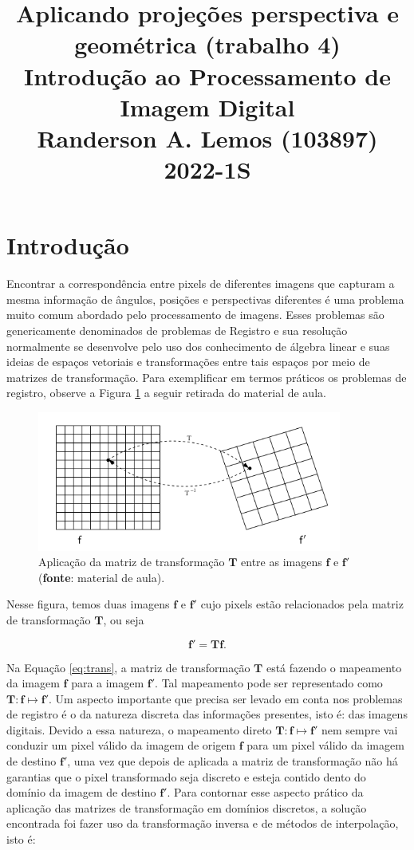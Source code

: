 \documentclass{article}
\title{
	Aplicando projeções perspectiva e geométrica (trabalho 4) \\
	\Large Introdução ao Processamento de Imagem Digital \\
	Randerson A. Lemos (103897)
	2022-1S
}
\date{\vspace{-5ex}}
\begin{document}
  \maketitle

%
\section{Introdução}
Encontrar a correspondência entre pixels de diferentes imagens que capturam a mesma informação de ângulos, posições e perspectivas diferentes é uma problema muito comum abordado pelo processamento de imagens. Esses problemas são genericamente denominados de problemas de Registro e sua resolução normalmente se desenvolve pelo uso dos conhecimento de álgebra linear e suas ideias de espaços vetoriais e transformações entre tais espaços por meio de matrizes de transformação. Para exemplificar em termos práticos os problemas de registro, observe a Figura \ref{fig:trans} a seguir retirada do material de aula.

\begin{figure}[!htp]%
	\centering
	\includegraphics[width=10cm]{transformacao.png}
	\caption{Aplicação da matriz de transformação $\mathbf{T}$ entre as imagens $\mathbf{f}$ e $\mathbf{f'}$ (\textbf{fonte}: material de aula).}%
	\label{fig:trans}%
\end{figure}

\noindent
Nesse figura, temos duas imagens $\mathbf{f}$ e $\mathbf{f'}$ cujo pixels estão relacionados pela matriz de transformação $\mathbf{T}$, ou seja

\begin{equation}
\mathbf{f'} = \mathbf{T}\mathbf{f}.
\label{eq:trans}
\end{equation}

\noindent
Na Equação \ref{eq:trans}, a matriz de transformação $\mathbf{T}$ está fazendo o mapeamento da imagem $\mathbf{f}$ para a imagem $\mathbf{f'}$. Tal mapeamento pode ser representado como $\mathbf{T}: \mathbf{f} \mapsto \mathbf{f'}$. Um aspecto importante que precisa ser levado em conta nos problemas de registro é o da natureza discreta das informações presentes, isto é: das imagens digitais. Devido a essa natureza, o mapeamento direto $\mathbf{T}: \mathbf{f} \mapsto \mathbf{f'}$ nem sempre vai conduzir um pixel válido da imagem de origem $\mathbf{f}$ para um pixel válido da imagem de destino $\mathbf{f'}$, uma vez que depois de aplicada a matriz de transformação não há garantias que o pixel transformado seja discreto e esteja contido dento do domínio da imagem de destino $\mathbf{f'}$. Para contornar esse aspecto prático da aplicação das matrizes de transformação em domínios discretos, a solução encontrada foi fazer uso da transformação inversa e de métodos de interpolação, isto é:
\end{document}
